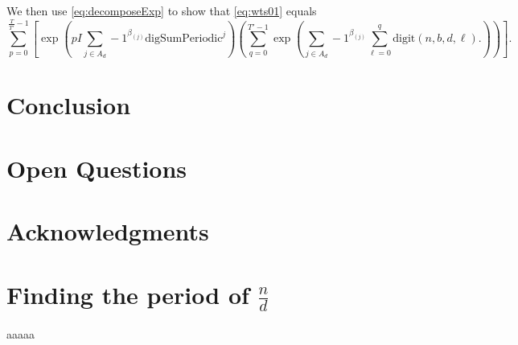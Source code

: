 \documentclass[11pt,titlepage]{article}
\newcommand{\rationalPeriodTotal}{{T}'}
\newcommand{\totalPeriod}{T}
\newcommand{\digSumPeriodic}{\mathrm{digSumPeriodic}^j}
\begin{document}
We then use \eqref{eq:decomposeExp} to show that \eqref{eq:wts01} equals
\begin{equation*}
  \sum_{p= 0}^{\frac{\totalPeriod}{\rationalPeriodTotal} - 1} \left[
    \exp\left(
      pI \sum_{j \in A_d} -1 ^ {\beta_{(j)}}
      \digSumPeriodic
    \right)
  \left(
  \sum_{q = 0}^{\rationalPeriodTotal - 1}
    \exp\left(
        \sum_{j \in A_d} -1 ^ {\beta_{(j)}}
          \sum_{\ell = 0}^{q}\mathrm{digit}(n, b, d, \ell).
    \right)\right)\right].
\end{equation*}





\section{Conclusion}

\section{Open Questions}


\section*{Acknowledgments}


\appendix
\section{Finding the period of $\frac{n}{d}$}
\label{AppendixPeriod}
aaaaa



\end{document}
